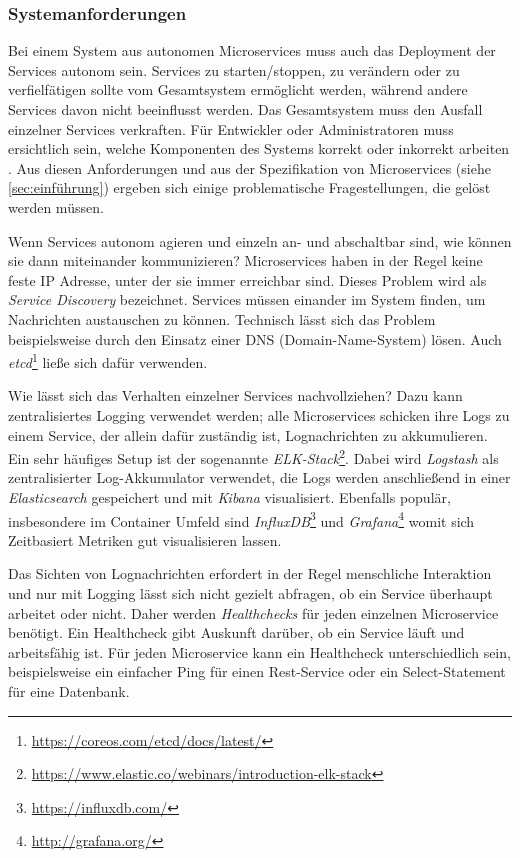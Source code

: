 \subsubsection{Systemanforderungen}
\label{subsec:arch-requirements}

Bei einem System aus autonomen Microservices muss auch das Deployment der Services autonom sein. Services zu starten/stoppen, zu verändern oder zu verfielfätigen sollte vom Gesamtsystem ermöglicht werden, während andere Services davon nicht beeinflusst werden. Das Gesamtsystem muss den Ausfall einzelner Services verkraften. Für Entwickler oder Administratoren muss ersichtlich sein, welche Komponenten des Systems korrekt oder inkorrekt arbeiten \cite{newman2015}. Aus diesen Anforderungen und aus der Spezifikation von Microservices (siehe \autoref{sec:einführung}) ergeben sich einige problematische Fragestellungen, die gelöst werden müssen.

Wenn Services autonom agieren und einzeln an- und abschaltbar sind, wie können sie dann miteinander kommunizieren? Microservices haben in der Regel keine feste IP Adresse, unter der sie immer erreichbar sind. Dieses Problem wird als \textit{Service Discovery} bezeichnet. Services müssen einander im System finden, um Nachrichten austauschen zu können. Technisch lässt sich das Problem beispielsweise durch den Einsatz einer DNS (Domain-Name-System) lösen. Auch \textit{etcd}\footnote{\url{https://coreos.com/etcd/docs/latest/}} ließe sich dafür verwenden.

Wie lässt sich das Verhalten einzelner Services nachvollziehen? Dazu kann zentralisiertes Logging verwendet werden; alle Microservices schicken ihre Logs zu einem Service, der allein dafür zuständig ist, Lognachrichten zu akkumulieren. Ein sehr häufiges Setup ist der sogenannte \textit{ELK-Stack}\footnote{\url{https://www.elastic.co/webinars/introduction-elk-stack}}. Dabei wird \textit{Logstash} als zentralisierter Log-Akkumulator verwendet, die Logs werden anschließend in einer \textit{Elasticsearch} gespeichert und mit \textit{Kibana} visualisiert. Ebenfalls populär, insbesondere im Container Umfeld sind \textit{InfluxDB}\footnote{\url{https://influxdb.com/}} und \textit{Grafana}\footnote{\url{http://grafana.org/}} womit sich Zeitbasiert Metriken gut visualisieren lassen.

Das Sichten von Lognachrichten erfordert in der Regel menschliche Interaktion und nur mit Logging lässt sich nicht gezielt abfragen, ob ein Service überhaupt arbeitet oder nicht. Daher werden \textit{Healthchecks} für jeden einzelnen Microservice benötigt. Ein Healthcheck gibt Auskunft darüber, ob ein Service läuft und arbeitsfähig ist. Für jeden Microservice kann ein Healthcheck unterschiedlich sein, beispielsweise ein einfacher Ping für einen Rest-Service oder ein Select-Statement für eine Datenbank.


